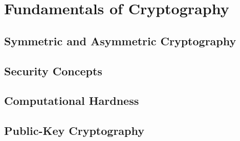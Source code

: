 \section{Fundamentals of Cryptography}
\label{chap:cryptoFundamentals}

\subsection{Symmetric and Asymmetric Cryptography}
\label{sec:symAsym}

\subsection{Security Concepts}
\label{sec:securityConcepts}

\subsection{Computational Hardness}
\label{sec:computationalHardness}

\subsection{Public-Key Cryptography}
\label{sec:publicKeyCrypto}
